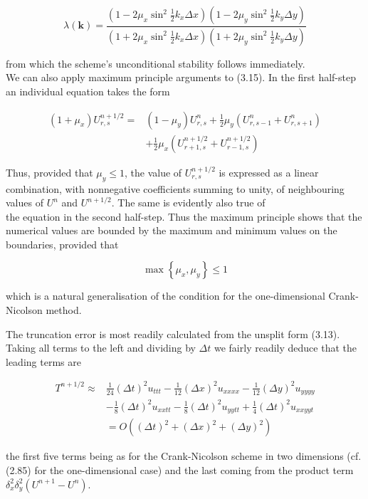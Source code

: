 \documentclass[10pt]{article}
\begin{document}
\[
\lambda(\mathbf{k})=\frac{\left(1-2 \mu_{x} \sin ^{2} \frac{1}{2} k_{x} \Delta x\right)\left(1-2 \mu_{y} \sin ^{2} \frac{1}{2} k_{y} \Delta y\right)}{\left(1+2 \mu_{x} \sin ^{2} \frac{1}{2} k_{x} \Delta x\right)\left(1+2 \mu_{y} \sin ^{2} \frac{1}{2} k_{y} \Delta y\right)}
\]

from which the scheme's unconditional stability follows immediately.\\
We can also apply maximum principle arguments to (3.15). In the first half-step an individual equation takes the form

\[
\begin{aligned}
\left(1+\mu_{x}\right) U_{r, s}^{n+1 / 2}= & \left(1-\mu_{y}\right) U_{r, s}^{n}+\frac{1}{2} \mu_{y}\left(U_{r, s-1}^{n}+U_{r, s+1}^{n}\right) \\
& +\frac{1}{2} \mu_{x}\left(U_{r+1, s}^{n+1 / 2}+U_{r-1, s}^{n+1 / 2}\right)
\end{aligned}
\]

Thus, provided that \(\mu_{y} \leq 1\), the value of \(U_{r, s}^{n+1 / 2}\) is expressed as a linear combination, with nonnegative coefficients summing to unity, of neighbouring values of \(U^{n}\) and \(U^{n+1 / 2}\). The same is evidently also true of\\
the equation in the second half-step. Thus the maximum principle shows that the numerical values are bounded by the maximum and minimum values on the boundaries, provided that

\[
\max \left\{\mu_{x}, \mu_{y}\right\} \leq 1
\]

which is a natural generalisation of the condition for the one-dimensional Crank-Nicolson method.

The truncation error is most readily calculated from the unsplit form (3.13). Taking all terms to the left and dividing by \(\Delta t\) we fairly readily deduce that the leading terms are

\[
\begin{aligned}
T^{n+1 / 2} \approx & \frac{1}{24}(\Delta t)^{2} u_{t t t}-\frac{1}{12}(\Delta x)^{2} u_{x x x x}-\frac{1}{12}(\Delta y)^{2} u_{y y y y} \\
& -\frac{1}{8}(\Delta t)^{2} u_{x x t t}-\frac{1}{8}(\Delta t)^{2} u_{y y t t}+\frac{1}{4}(\Delta t)^{2} u_{x x y y t} \\
& =O\left((\Delta t)^{2}+(\Delta x)^{2}+(\Delta y)^{2}\right)
\end{aligned}
\]

the first five terms being as for the Crank-Nicolson scheme in two dimensions (cf. (2.85) for the one-dimensional case) and the last coming from the product term \(\delta_{x}^{2} \delta_{y}^{2}\left(U^{n+1}-U^{n}\right)\).
\end{document}

